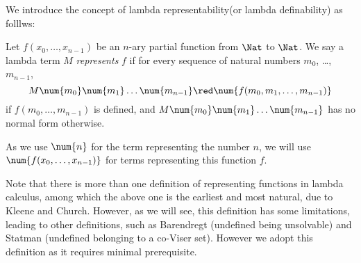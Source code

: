 \documentclass[../../../include/open-logic-section]{subfiles}
\begin{document}

We introduce the concept of lambda representability(or
lambda definability) as folllws:
\begin{defn}
Let $f(x_0, \dots, x_{n-1})$ be an $n$-ary partial function from $\Nat$
to $\Nat$. We say a lambda term $M$ \emph{represents} $f$ if for every
sequence of natural numbers $m_0$, \dots,~$m_{n-1}$,
\[
M \num{m_0} \num{m_1} \dots \num{m_{n-1}} \red \num{f(m_0, m_1, \dots,
  m_{n-1})}
\]
if $f(m_0, \dots, m_{n-1})$ is defined, and $M \num{m_0} \num{m_1}
\dots \num{m_{n-1}}$ has no normal form otherwise. 
\end{defn}

As we use $\num{n}$ for the term representing the number $n$, we will
use $\num{f(x_0, \dots, x_{n-1})}$ for terms representing this
function $f$.

Note that there is more than one definition of representing functions in lambda
calculus, among which the above one is the earliest and most natural,
due to Kleene and Church. However, as we will see, this definition has
some limitations, leading to other definitions, such as
Barendregt (undefined being unsolvable) and Statman (undefined belonging
to a co-Viser set). However we adopt this definition as it requires
minimal prerequisite.
\end{document}
